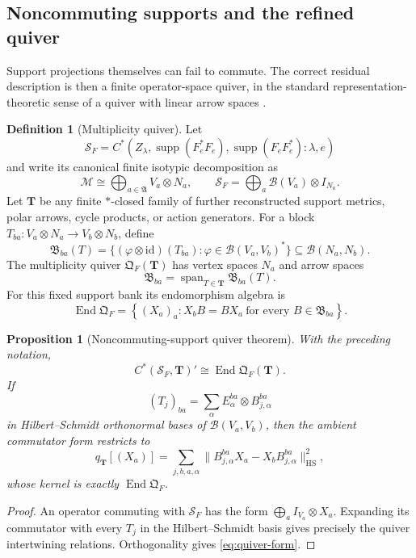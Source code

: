 \documentclass[11pt]{article}
\numberwithin{equation}{section}
\newtheorem{proposition}[theorem]{Proposition}
\theoremstyle{definition}
\newtheorem{definition}[theorem]{Definition}
\theoremstyle{remark}
\newcommand{\id}{\mathrm{id}}
\newcommand{\Span}{\operatorname{span}}
\newcommand{\End}{\operatorname{End}}
\newcommand{\supp}{\operatorname{supp}}
\newcommand{\HS}{\mathrm{HS}}
\newcommand{\norm}[1]{\lVert#1\rVert}
\begin{document}
\subsection{Noncommuting supports and the refined quiver}

Support projections themselves can fail to commute.  The correct residual
description is then a finite operator-space quiver, in the standard
representation-theoretic sense of a quiver with linear arrow spaces
\cite{Schiffler2014}.

\begin{definition}[Multiplicity quiver]
\label{def:multiplicity-quiver}
Let
\[
\mathcal S_F
=
C^*(Z_\lambda,\supp(F_e^*F_e),\supp(F_eF_e^*):\lambda,e)
\]
and write its canonical finite isotypic decomposition as
\[
\mathscr M
\cong
\bigoplus_{a\in\mathfrak A}V_a\otimes N_a,
\qquad
\mathcal S_F
=
\bigoplus_a\mathcal B(V_a)\otimes I_{N_a}.
\]
Let $\bm T$ be any finite $*$-closed family of further reconstructed support
metrics, polar arrows, cycle products, or action generators.  For a block
$T_{ba}:V_a\otimes N_a\to V_b\otimes N_b$, define
\[
\mathfrak B_{ba}(T)
=
\{(\varphi\otimes\id)(T_{ba}):
\varphi\in\mathcal B(V_a,V_b)^*\}
\subseteq\mathcal B(N_a,N_b).
\]
The multiplicity quiver $\mathfrak Q_F(\bm T)$ has vertex spaces $N_a$ and
arrow spaces
\[
\mathfrak B_{ba}
=
\Span_{T\in\bm T}\mathfrak B_{ba}(T).
\]
For this fixed support bank its endomorphism algebra is
\[
\End\mathfrak Q_F
=
\left\{(X_a)_a:
X_bB=BX_a
\ \text{for every }B\in\mathfrak B_{ba}\right\}.
\]
\end{definition}

\begin{proposition}[Noncommuting-support quiver theorem]
\label{thm:quiver}
With the preceding notation,
\begin{equation}
C^*(\mathcal S_F,\bm T)'
\cong
\End\mathfrak Q_F(\bm T).
\label{eq:quiver-commutant}
\end{equation}
If
\[
(T_j)_{ba}
=
\sum_\alpha E_\alpha^{ba}\otimes B_{j,\alpha}^{ba}
\]
in Hilbert--Schmidt orthonormal bases of
$\mathcal B(V_a,V_b)$, then the ambient commutator form restricts to
\begin{equation}
q_{\bm T}[(X_a)]
=
\sum_{j,b,a,\alpha}
\norm{B_{j,\alpha}^{ba}X_a-X_bB_{j,\alpha}^{ba}}_{\HS}^2,
\label{eq:quiver-form}
\end{equation}
whose kernel is exactly $\End\mathfrak Q_F$.
\end{proposition}

\begin{proof}
An operator commuting with $\mathcal S_F$ has the form
$\bigoplus_a I_{V_a}\otimes X_a$.  Expanding its commutator with every
$T_j$ in the Hilbert--Schmidt basis gives precisely the quiver intertwining
relations.  Orthogonality gives \eqref{eq:quiver-form}.
\end{proof}
\end{document}
